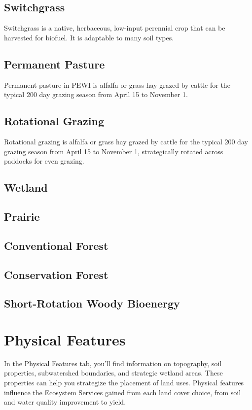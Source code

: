 \documentclass[11pt]{article}
\begin{document}
\subsection{Switchgrass}
Switchgrass is a native, herbaceous, low-input perennial crop that can be harvested for biofuel. It is adaptable to many soil types.

\subsection{Permanent Pasture}
Permanent pasture in PEWI is alfalfa or grass hay grazed by cattle for the typical 200 day grazing season from April 15 to November 1.\cite{10}

\subsection{Rotational Grazing}
Rotational grazing is alfalfa or grass hay grazed by cattle for the typical 200 day grazing season from April 15 to November 1, strategically rotated across paddocks for even grazing.\cite{11}

\subsection{Wetland}

\subsection{Prairie}

\subsection{Conventional Forest}

\subsection{Conservation Forest}

\subsection{Short-Rotation Woody Bioenergy}

\newpage
\section{Physical Features}\label{sec:physicalfeatures}
In the Physical Features tab, you'll find information on topography, soil properties, subwatershed boundaries, and strategic wetland areas. These properties can help you strategize the placement of land uses. Physical features influence the Ecosystem Services gained from each land cover choice, from soil and water quality improvement to yield.
\end{document}
